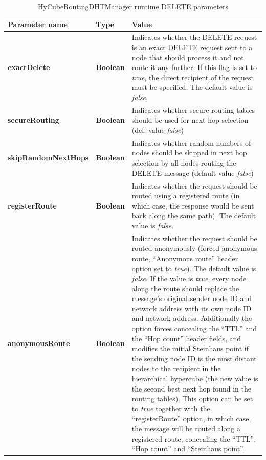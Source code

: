 \begin{table}
\scriptsize
\begin{center}
\begin{tabular}{p{2.5cm} p{1.5cm} p{10.5cm}}
	\hline
	\textbf{Parameter name}					& \textbf{Type}					& \textbf{Value}					\\[1mm]
    \hline
	\textbf{exactDelete}					& \textbf{Boolean}				& Indicates whether the DELETE request is an exact DELETE request sent to a node that should process it and not route it any further. If this flag is set to \emph{true}, the direct recipient of the request must be specified. The default value is \emph{false}.			\\[1.5mm]
	\textbf{secureRouting}					& \textbf{Boolean}				& Indicates whether secure routing tables should be used for next hop selection (def. value \emph{false})			\\[1.5mm]
	\textbf{skipRandomNextHops}				& \textbf{Boolean}				& Indicates whether random numbers of nodes should be skipped in next hop selection by all nodes routing the DELETE message (default value \emph{false})		\\[1.5mm]
	\textbf{registerRoute}					& \textbf{Boolean}				& Indicates whether the request should be routed using a registered route (in which case, the response would be sent back along the same path). The default value is \emph{false}.		\\[1.5mm]
	\textbf{anonymousRoute}					& \textbf{Boolean}				& Indicates whether the request should be routed anonymously (forced anonymous route, ``Anonymous route'' header option set to \emph{true}). The default value is \emph{false}. If the value is \emph{true}, every node along the route should replace the message's original sender node ID and network address with its own node ID and network address. Additionally the option forces concealing the ``TTL'' and the ``Hop count'' header fields, and modifies the initial Steinhaus point if the sending node ID is the most distant nodes to the recipient in the hierarchical hypercube (the new value is the second best next hop found in the routing tables). This option can be set to \emph{true} together with the ``registerRoute'' option, in which case, the message will be routed along a registered route, concealing the ``TTL'', ``Hop count'' and ``Steinhaus point''.		\\[1.5mm]
    \hline
\end{tabular}
\end{center}
\caption{HyCubeRoutingDHTManager runtime DELETE parameters}
\label{tab:HyCubeRoutingDHTManagerDeleteParameters}
\end{table}







